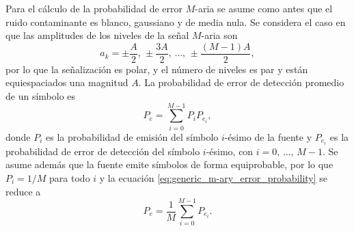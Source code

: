 \documentclass[a4paper]{article}
\begin{document}
Para el cálculo de la probabilidad de error \(M\)-aria se asume como antes que el ruido contaminante es blanco, gaussiano y de media nula. Se considera el caso en que las amplitudes de los niveles de la señal \(M\)-aria son
\begin{equation}\label{eq:m-ary_ak}
 a_k=\pm \frac{A}{2},\,\pm \frac{3A}{2},\,\dots,\,\pm \frac{(M-1)A}{2},
\end{equation}
por lo que la señalización es polar, y el número de niveles es par y están equiespaciados una magnitud \(A\). La probabilidad de error de detección promedio de un símbolo es
\begin{equation}\label{eq:generic_m-ary_error_probability}
 P_e = \sum_{i=0}^{M-1}P_iP_{e_i},
\end{equation}
donde \(P_i\) es la probabilidad de emisión del símbolo \(i\)-ésimo de la fuente y \(P_{e_i}\) es la probabilidad de error de detección del símbolo \(i\)-ésimo, con \(i=0,\,\dots,\,M-1\). Se asume además que la fuente emite símbolos de forma equiprobable, por lo que \(P_i=1/M\) para todo \(i\) y la ecuación \ref{eq:generic_m-ary_error_probability} se reduce a
\begin{equation}\label{eq:generic_m-ary_error_probability_aux}
 P_e = \frac{1}{M}\sum_{i=0}^{M-1}P_{e_i}.
\end{equation}
\end{document}
